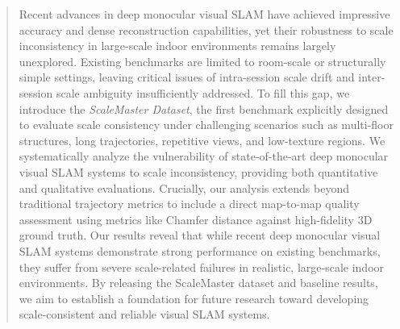 
\begin{abstract}
Recent advances in deep monocular visual \ac{SLAM} have achieved impressive accuracy and dense reconstruction capabilities, yet their robustness to scale inconsistency in large-scale indoor environments remains largely unexplored. Existing benchmarks are limited to room-scale or structurally simple settings, leaving critical issues of intra-session scale drift and inter-session scale ambiguity insufficiently addressed. To fill this gap, we introduce the \textit{ScaleMaster Dataset}, the first benchmark explicitly designed to evaluate scale consistency under challenging scenarios such as multi-floor structures, long trajectories, repetitive views, and low-texture regions. We systematically analyze the vulnerability of state-of-the-art deep monocular visual SLAM systems to scale inconsistency, providing both quantitative and qualitative evaluations. Crucially, our analysis extends beyond traditional trajectory metrics to include a direct map-to-map quality assessment using metrics like Chamfer distance against high-fidelity 3D ground truth. Our results reveal that while recent deep monocular visual \ac{SLAM} systems demonstrate strong performance on existing benchmarks, they suffer from severe scale-related failures in realistic, large-scale indoor environments. By releasing the ScaleMaster dataset and baseline results, we aim to establish a foundation for future research toward developing scale-consistent and reliable visual \ac{SLAM} systems.

\end{abstract}


